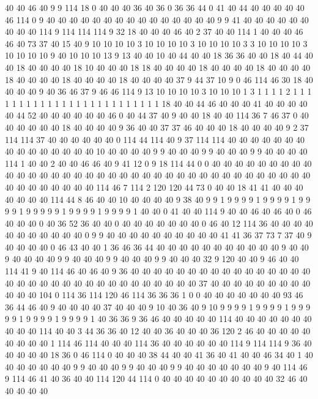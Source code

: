 40 40 46 40 9 9 114 18 0 40 40 40 36 40 36 0 36 36 44 0
41 40 44 40 40 40 40 40 46 114 0 9 40 40 40 40 40 40 40 40
40 40 40 40 40 40 40 9 9 41 40 40 40 40 40 40 40 40 40 114
9 114 114 114 9 32 18 40 40 40 46 40 2 37 40 40 114 1 40 40
40 46 46 40 73 37 40 15 40 9 10 10 10 10 3 10 10 10 10 3
10 10 10 10 3 3 10 10 10 10 3 10 10 10 10 9 40 10 10 10
13 9 13 40 40 10 40 44 40 40 18 36 36 40 40 18 40 44 40 40
18 40 40 40 40 18 10 40 40 40 18 18 40 40 40 40 18 40 40 40
40 18 40 40 40 40 18 40 40 40 40 18 40 40 40 40 18 40 40 40
40 37 9 44 37 10 9 0 46 114 46 30 18 40 40 40 40 9 40 36
46 37 9 46 46 114 9 13 10 10 10 10 3 10 10 10 1 3 1 1
1 1 2 1 1 1 1 1 1 1 1 1 1 1 1 1 1 1 1 1
1 1 1 1 1 1 1 1 18 40 40 44 46 40 40 40 41 40 40 40
40 40 44 52 40 40 40 40 40 40 46 0 40 44 37 40 9 40 40 18
40 40 114 36 7 46 37 0 40 40 40 40 40 40 18 40 40 40 40 9
36 40 40 37 37 46 40 40 40 18 40 40 40 40 9 2 37 114 114 37
40 40 40 40 40 40 0 114 44 114 40 9 37 114 114 40 40 40 40 40
40 40 40 40 40 40 40 40 40 40 10 40 40 40 40 9 9 40 40 40
9 9 40 40 40 9 9 40 40 40 40 114 1 40 40 2 40 40 46 46
40 9 41 12 0 9 18 114 44 0 0 40 40 40 40 40 40 40 40 40
40 40 40 40 40 40 40 40 40 40 40 40 40 40 40 40 40 40 40 40
40 40 40 40 40 40 40 40 40 40 40 40 40 40 40 114 46 7 114 2
120 120 44 73 0 40 40 18 41 41 40 40 40 40 40 40 40 114 44 8
46 40 40 10 40 40 40 40 9 38 40 9 9 1 9 9 9 9 1 9
9 9 9 1 9 9 9 9 1 9 9 9 9 9 1 9 9 9 9 1
9 9 9 9 1 40 40 0 41 40 40 114 9 40 40 46 40 46 40 0
46 40 40 40 0 40 36 52 36 40 40 0 40 40 40 40 40 40 40 0
46 40 12 114 36 40 40 40 40 40 40 40 40 40 40 40 0 9 9 40
40 40 40 40 40 40 40 40 40 41 41 36 37 73 7 37 40 9 40 40
40 40 0 46 43 40 40 1 36 46 36 44 40 40 40 40 40 40 40 40
40 40 40 9 40 40 9 40 40 40 40 9 9 40 40 40 9 9 40 40
40 9 9 40 40 40 32 9 120 40 40 9 46 40 40 114 41 9 40 114
46 40 46 40 9 36 40 40 40 40 40 40 40 40 40 40 40 40 40 40
40 40 40 40 40 40 40 40 40 40 40 40 40 40 40 40 40 40 40 37
40 40 40 40 40 40 40 40 40 40 40 40 104 0 114 36 114 120 46 114
36 36 36 1 0 0 40 40 40 40 40 40 40 93 46 36 44 46 40 9
40 40 40 40 37 40 40 40 9 10 40 36 40 9 10 9 9 9 9 1
9 9 9 9 1 9 9 9 9 9 1 9 9 9 9 1 9 9 9 9
1 40 36 36 9 36 46 40 40 40 40 40 114 40 40 40 40 40 40 40
40 40 40 114 40 40 3 44 36 36 40 12 40 40 36 40 40 40 36 120
2 46 40 40 40 40 40 40 40 40 40 1 114 46 114 40 40 40 114 36
40 40 40 40 40 40 114 9 114 114 9 36 40 40 40 40 40 18 36 0
46 114 0 40 40 40 38 44 40 40 41 36 40 41 40 40 46 34 40 1
40 40 40 40 40 40 40 9 9 40 40 40 9 9 40 40 40 9 9 40
40 40 40 40 40 40 9 40 114 46 9 114 46 41 40 36 40 40 114 120
44 114 0 40 40 40 40 40 40 40 40 40 40 32 46 40 40 40 40 40

